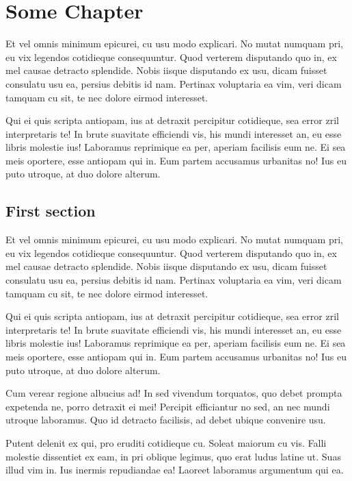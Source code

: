 \chapter{Some Chapter}

Et vel omnis minimum epicurei, cu usu modo explicari. No mutat numquam pri, eu
vix legendos cotidieque consequuntur. Quod verterem disputando quo in, ex mel
causae detracto splendide. Nobis iisque disputando ex usu, dicam fuisset
consulatu usu ea, persius debitis id nam. Pertinax voluptaria ea vim, veri dicam
tamquam cu sit, te nec dolore eirmod interesset.

Qui ei quis scripta antiopam, ius at detraxit percipitur cotidieque, sea error
zril interpretaris te! In brute suavitate efficiendi vis, his mundi interesset
an, eu esse libris molestie ius! Laboramus reprimique ea per, aperiam facilisis
eum ne. Ei sea meis oportere, esse antiopam qui in. Eum partem accusamus
urbanitas no! Ius eu puto utroque, at duo dolore alterum.

\section{First section}

Et vel omnis minimum epicurei, cu usu modo explicari. No mutat numquam pri, eu
vix legendos cotidieque consequuntur. Quod verterem disputando quo in, ex mel
causae detracto splendide. Nobis iisque disputando ex usu, dicam fuisset
consulatu usu ea, persius debitis id nam. Pertinax voluptaria ea vim, veri dicam
tamquam cu sit, te nec dolore eirmod interesset.

Qui ei quis scripta antiopam, ius at detraxit percipitur cotidieque, sea error
zril interpretaris te! In brute suavitate efficiendi vis, his mundi interesset
an, eu esse libris molestie ius! Laboramus reprimique ea per, aperiam facilisis
eum ne. Ei sea meis oportere, esse antiopam qui in. Eum partem accusamus
urbanitas no! Ius eu puto utroque, at duo dolore alterum.

Cum verear regione albucius ad! In sed vivendum torquatos, quo debet prompta
expetenda ne, porro detraxit ei mei! Percipit efficiantur no sed, an nec mundi
utroque laboramus. Quo id detracto facilisis, ad debet ubique convenire usu.

Putent delenit ex qui, pro eruditi cotidieque cu. Soleat maiorum cu vis. Falli
molestie dissentiet ex eam, in pri oblique legimus, quo erat ludus latine ut.
Suas illud vim in. Ius inermis repudiandae ea! Laoreet laboramus argumentum qui
ea.

